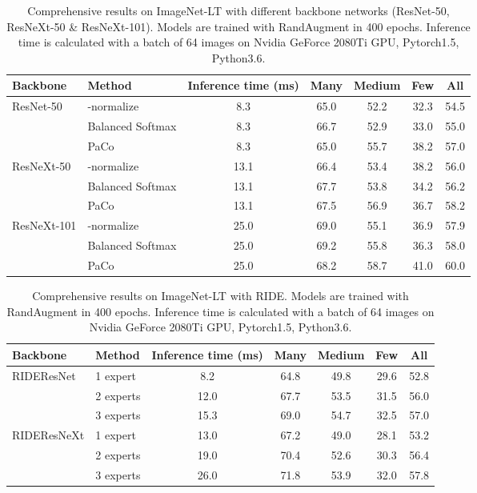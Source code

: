 \documentclass[10pt,twocolumn,letterpaper]{article}
\begin{document}
\begin{table*}[h]
	\caption{Comprehensive results on ImageNet-LT with different backbone networks (ResNet-50, ResNeXt-50 \& ResNeXt-101). Models are trained with RandAugment in 400 epochs. Inference time is calculated with a batch of 64 images on Nvidia GeForce 2080Ti GPU, Pytorch1.5, Python3.6.}
	\label{tab:imagenet_extra}
\begin{center}
		\begin{tabular}{llccccc}
			\toprule
			Backbone & Method & \textbf{Inference time (ms)} & Many & Medium & Few & All\\
			\midrule
			\multirow{3}{*}{ResNet-50}
			&-normalize &8.3 &65.0 &52.2 &32.3 &54.5 \\
			&Balanced Softmax &8.3 &66.7 &52.9 &33.0 &55.0 \\
			&PaCo             &8.3 &65.0 &55.7 &38.2 &57.0\\
			\midrule
			\multirow{3}{*}{ResNeXt-50}
			&-normalize &13.1 &66.4 &53.4 &38.2 &56.0 \\
			&Balanced Softmax &13.1 &67.7 &53.8 &34.2 &56.2\\
			&PaCo             &13.1 &67.5 &56.9 &36.7 &58.2\\
			\midrule
			\multirow{3}{*}{ResNeXt-101}
			&-normalize &25.0 &69.0 &55.1 &36.9 &57.9 \\
			&Balanced Softmax &25.0 &69.2 &55.8 &36.3 &58.0 \\
			&PaCo             &25.0 &68.2 &58.7 &41.0 &60.0 \\
			\bottomrule
		\end{tabular}
	\end{center}
\end{table*}

\begin{table*}[h]
	\caption{Comprehensive results on ImageNet-LT with RIDE. Models are trained with RandAugment in 400 epochs. Inference time is calculated with a batch of 64 images on Nvidia GeForce 2080Ti GPU, Pytorch1.5, Python3.6.}
\label{tab:imagenet_ride}
	\begin{center}
		\begin{tabular}{llccccc}
			\toprule
			Backbone & Method & \textbf{Inference time (ms)} & Many & Medium & Few & All\\
			\midrule
			\multirow{3}{*}{RIDEResNet}
			&1 expert  &8.2  &64.8 &49.8 &29.6 &52.8 \\
			&2 experts &12.0 &67.7 &53.5 &31.5 &56.0 \\
			&3 experts &15.3 &69.0 &54.7 &32.5 &57.0 \\
			\midrule
			\multirow{3}{*}{RIDEResNeXt}
			&1 expert  &13.0 &67.2 &49.0 &28.1 &53.2 \\
			&2 experts &19.0 &70.4 &52.6 &30.3 &56.4 \\
			&3 experts &26.0 &71.8 &53.9 &32.0 &57.8 \\
			\bottomrule
		\end{tabular}
	\end{center}
\end{table*}
\end{document}
